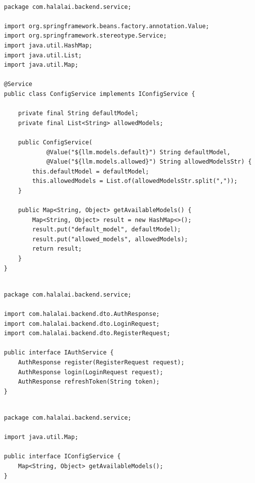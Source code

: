 \begin{lstlisting}[basicstyle=\tiny\ttfamily,breaklines=true]

package com.halalai.backend.service;

import org.springframework.beans.factory.annotation.Value;
import org.springframework.stereotype.Service;
import java.util.HashMap;
import java.util.List;
import java.util.Map;

@Service
public class ConfigService implements IConfigService {

    private final String defaultModel;
    private final List<String> allowedModels;

    public ConfigService(
            @Value("${llm.models.default}") String defaultModel,
            @Value("${llm.models.allowed}") String allowedModelsStr) {
        this.defaultModel = defaultModel;
        this.allowedModels = List.of(allowedModelsStr.split(","));
    }

    public Map<String, Object> getAvailableModels() {
        Map<String, Object> result = new HashMap<>();
        result.put("default_model", defaultModel);
        result.put("allowed_models", allowedModels);
        return result;
    }
}
\end{lstlisting}

\begin{lstlisting}[basicstyle=\tiny\ttfamily,breaklines=true]

package com.halalai.backend.service;

import com.halalai.backend.dto.AuthResponse;
import com.halalai.backend.dto.LoginRequest;
import com.halalai.backend.dto.RegisterRequest;

public interface IAuthService {
    AuthResponse register(RegisterRequest request);
    AuthResponse login(LoginRequest request);
    AuthResponse refreshToken(String token);
}
\end{lstlisting}

\begin{lstlisting}[basicstyle=\tiny\ttfamily,breaklines=true]

package com.halalai.backend.service;

import java.util.Map;

public interface IConfigService {
    Map<String, Object> getAvailableModels();
}
\end{lstlisting}

